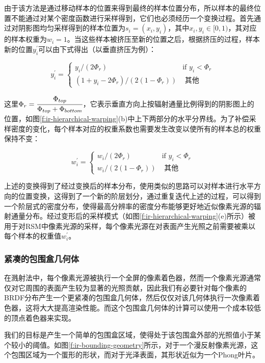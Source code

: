 由于该方法是通过移动样本的位置来得到最终的样本位置分布，所以样本的最终位置不能通过对某个密度函数进行采样得到，它们也必须经历一个变换过程。首先通过对阴影图均匀采样得到的样本位置为$s_i=(x_i,y_i)$，其中$x_i,y_i\in[0,1)$，其对应的样本权重为$w_i=1$。当这些样本被挤压至新的位置之后，根据挤压的过程，样本新的位置$y^{'}_i$可以由下式得出（以垂直挤压为例）：

\begin{equation}
	y^{'}_i=\begin{cases}
		y_i/(2\Phi_r) &\text{if }y_i<\Phi_r\\
		(1+y_i-2\Phi_r)/(2(1-\Phi_r)) & \text{ 其他}
	\end{cases}
\end{equation}

\noindent 这里$\Phi_r= \cfrac{\Phi_{top}}{\Phi_{top}+\Phi_{bottom}}$，它表示垂直方向上按辐射通量比例得到的阴影图上的位置，如图\ref{f:ir-hierarchical-warping}(b)中上下两部分的水平分界线。为了补偿采样密度的变化，每个样本对应的权重系数也需要发生改变以使所有的样本总的权重保持不变：

\begin{equation}
	w^{'}_i=\begin{cases}
		w_i/(2\Phi_r)     & \text{if }y_i<\Phi_r \\
		w_i/(2(1-\Phi_r)) & \text{ 其他}
	\end{cases}
\end{equation}

\noindent 上述的变换得到了经过变换后的样本分布，使用类似的思路可以对样本进行水平方向的位置变换，这得到了一个新的阶层划分，通过重复迭代上述的过程，可以得到一个阶层式的密度分布，使得最高分辨率的密度分布能够更好地近似像素光源的辐射通量分布。经过变形后的采样模式（如图\ref{f:ir-hierarchical-warping}(e)所示）被用于对RSM中像素光源的采样，每个像素光源在对表面产生光照之前需要被乘以每个样本的权重值$w^{'}_i$。




\subsubsection{紧凑的包围盒几何体}
在溅射法中，每个像素光源被执行一个全屏的像素着色器，然而一个像素光源通常仅对它周围的表面产生较为显著的光照贡献，因此我们有必要针对每个像素的BRDF分布产生一个更紧凑的包围盒几何体，然后仅仅对该几何体执行一次像素着色器，这将大大提高渲染性能。而这个包围盒几何体的计算可以使用一个成本较低的顶点着色器来实现。

我们的目标是产生一个简单的包围盒区域，使得处于该包围盒外部的光照值小于某个较小的阈值。如图\ref{f:ir-bounding-geometry}所示，对于一个漫反射像素光源，这个包围区域为一个蛋形的形状，而对于光泽表面，其形状近似为一个Phong叶片。

